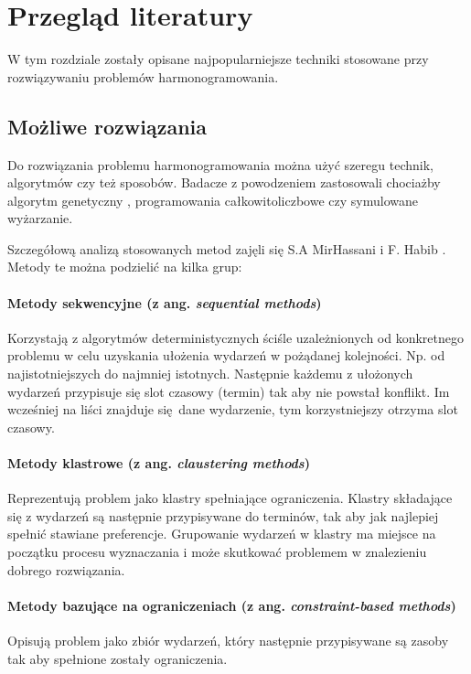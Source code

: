 \chapter{Przegląd literatury}
W tym rozdziale zostały opisane najpopularniejsze techniki stosowane przy
rozwiązywaniu problemów harmonogramowania.
\section{Możliwe rozwiązania}
Do rozwiązania problemu harmonogramowania można użyć szeregu technik, algorytmów
czy też sposobów. Badacze z powodzeniem zastosowali chociażby algorytm
genetyczny \cite{assi2018}, programowania całkowitoliczbowe \cite{yakoob2007} czy symulowane wyżarzanie\cite{marzec2020}.

Szczegółową analizą stosowanych metod zajęli się S.A MirHassani i F. Habib
\cite{habib2013}. Metody te można podzielić na kilka grup:

\subsubsection{Metody sekwencyjne (z ang. \emph{sequential methods})}
Korzystają z algorytmów deterministycznych ściśle uzależnionych od konkretnego
problemu w celu uzyskania ułożenia wydarzeń w pożądanej kolejności. Np. od
najistotniejszych do najmniej istotnych. Następnie każdemu z
ułożonych wydarzeń przypisuje się slot czasowy (termin) tak aby nie powstał
konflikt. Im wcześniej na liści znajduje się dane wydarzenie, tym korzystniejszy
otrzyma slot czasowy.

\subsubsection{Metody klastrowe (z ang. \emph{claustering methods})} 
Reprezentują problem jako klastry spełniające
ograniczenia. Klastry składające się z wydarzeń są następnie przypisywane do
terminów, tak aby jak najlepiej spełnić stawiane preferencje. Grupowanie
wydarzeń w klastry ma miejsce na początku procesu wyznaczania i może skutkować
problemem w znalezieniu dobrego rozwiązania.

\subsubsection{Metody bazujące na ograniczeniach (z ang. \emph{constraint-based methods})} 
Opisują problem jako zbiór wydarzeń, który
następnie przypisywane są zasoby tak aby spełnione zostały ograniczenia.

